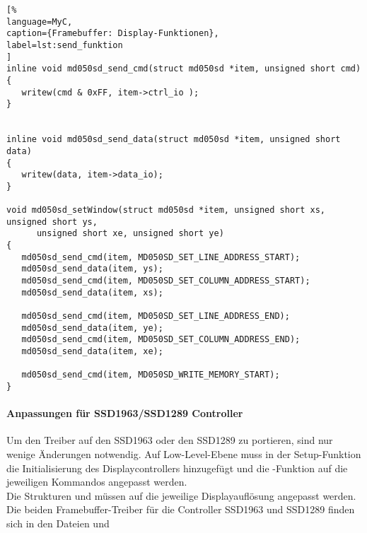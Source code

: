 \begin{lstlisting}[%
language=MyC,
caption={Framebuffer: Display-Funktionen},
label=lst:send_funktion
]
inline void md050sd_send_cmd(struct md050sd *item, unsigned short cmd)
{
   writew(cmd & 0xFF, item->ctrl_io );
}


inline void md050sd_send_data(struct md050sd *item, unsigned short data)
{
   writew(data, item->data_io);
}

void md050sd_setWindow(struct md050sd *item, unsigned short xs, unsigned short ys,
      unsigned short xe, unsigned short ye)
{
   md050sd_send_cmd(item, MD050SD_SET_LINE_ADDRESS_START);
   md050sd_send_data(item, ys);
   md050sd_send_cmd(item, MD050SD_SET_COLUMN_ADDRESS_START);
   md050sd_send_data(item, xs);

   md050sd_send_cmd(item, MD050SD_SET_LINE_ADDRESS_END);
   md050sd_send_data(item, ye);
   md050sd_send_cmd(item, MD050SD_SET_COLUMN_ADDRESS_END);
   md050sd_send_data(item, xe);

   md050sd_send_cmd(item, MD050SD_WRITE_MEMORY_START);
}
\end{lstlisting}
\paragraph{Anpassungen für SSD1963/SSD1289 Controller}
Um den Treiber auf den SSD1963 oder den SSD1289 zu portieren, sind nur wenige Änderungen notwendig. Auf Low-Level-Ebene muss in der Setup-Funktion die Initialisierung des Displaycontrollers hinzugefügt und die -Funktion auf die jeweiligen Kommandos angepasst werden. \\
Die Strukturen  und  müssen auf die jeweilige Displayauflösung angepasst werden. Die beiden Framebuffer-Treiber für die Controller SSD1963 und SSD1289 finden sich in den Dateien  und 
\newpage
